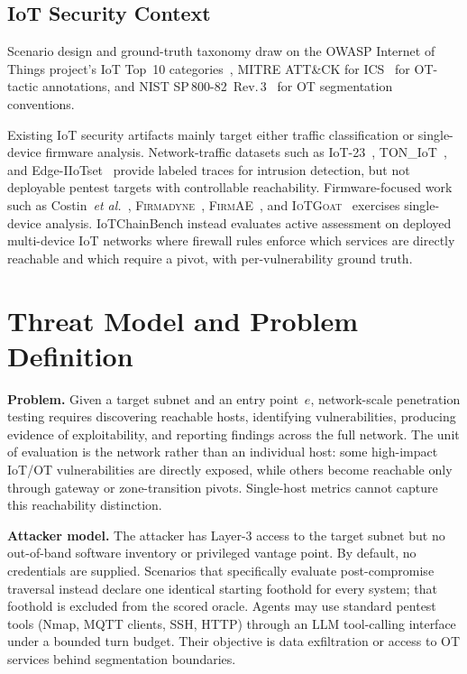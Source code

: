 \documentclass[conference,compsoc]{IEEEtran}
\newcommand{\systemname}{IoTChainBench\xspace}
\begin{document}
\subsection{IoT Security Context}
\label{sec:related:iot}

Scenario design and ground-truth taxonomy draw on the OWASP Internet of Things project's IoT Top~10 categories~\cite{owasp-iot}, MITRE ATT\&CK for ICS~\cite{mitre-ics} for OT-tactic annotations, and NIST SP\,800-82~Rev.\,3~\cite{nist80082} for OT segmentation conventions.

Existing IoT security artifacts mainly target either traffic classification or single-device firmware analysis. Network-traffic datasets such as IoT-23~\cite{iot23}, TON\_IoT~\cite{toniot20}, and Edge-IIoTset~\cite{edgeiiotset22} provide labeled traces for intrusion detection, but not deployable pentest targets with controllable reachability. Firmware-focused work such as Costin~\emph{et al.}~\cite{costin14}, \textsc{Firmadyne}~\cite{firmadyne16}, \textsc{FirmAE}~\cite{firmae20}, and \textsc{IoTGoat}~\cite{iotgoat} exercises single-device analysis. \systemname{} instead evaluates active assessment on deployed multi-device IoT networks where firewall rules enforce which services are directly reachable and which require a pivot, with per-vulnerability ground truth.

\section{Threat Model and Problem Definition}
\label{sec:threat}


\textbf{Problem.}
Given a target subnet and an entry point~$e$, network-scale penetration testing requires discovering reachable hosts, identifying vulnerabilities, producing evidence of exploitability, and reporting findings across the full network. The unit of evaluation is the network rather than an individual host: some high-impact IoT/OT vulnerabilities are directly exposed, while others become reachable only through gateway or zone-transition pivots. Single-host metrics cannot capture this reachability distinction.

\textbf{Attacker model.}
The attacker has Layer-3 access to the target subnet but no out-of-band software inventory or privileged vantage point. By default, no credentials are supplied. Scenarios that specifically evaluate post-compromise traversal instead declare one identical starting foothold for every system; that foothold is excluded from the scored oracle. Agents may use standard pentest tools (Nmap, MQTT clients, SSH, HTTP) through an LLM tool-calling interface under a bounded turn budget. Their objective is data exfiltration or access to OT services behind segmentation boundaries.
\end{document}
